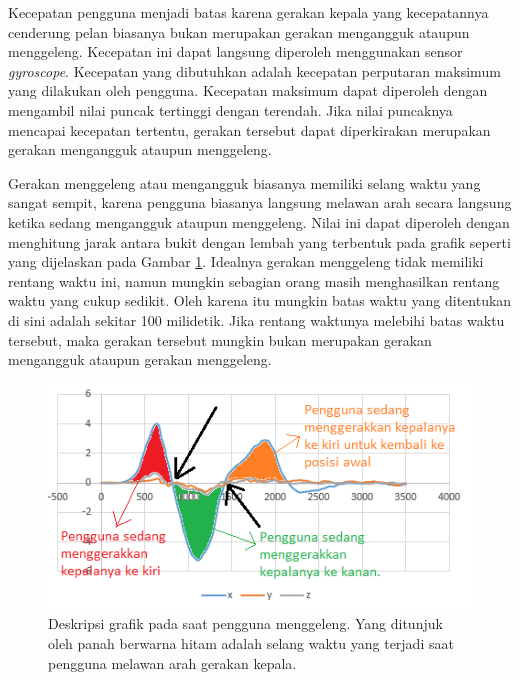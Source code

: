 Kecepatan pengguna menjadi batas karena gerakan kepala yang kecepatannya cenderung pelan biasanya bukan merupakan gerakan mengangguk ataupun menggeleng. Kecepatan ini dapat langsung diperoleh menggunakan sensor \textit{gyroscope}. Kecepatan yang dibutuhkan adalah kecepatan perputaran maksimum yang dilakukan oleh pengguna. Kecepatan maksimum dapat diperoleh dengan mengambil nilai puncak tertinggi dengan terendah. Jika nilai puncaknya mencapai kecepatan tertentu, gerakan tersebut dapat diperkirakan merupakan gerakan mengangguk ataupun menggeleng.

Gerakan menggeleng atau mengangguk biasanya memiliki selang waktu yang sangat sempit, karena pengguna biasanya langsung melawan arah secara langsung ketika sedang mengangguk ataupun menggeleng. Nilai ini dapat diperoleh dengan menghitung jarak antara bukit dengan lembah yang terbentuk pada grafik seperti yang dijelaskan pada Gambar \ref{fig:grafik-penjelasan-jarak-waktu-melawan-gerakan}. Idealnya gerakan menggeleng tidak memiliki rentang waktu ini, namun mungkin sebagian orang masih menghasilkan rentang waktu yang cukup sedikit. Oleh karena itu mungkin batas waktu yang ditentukan di sini adalah sekitar 100 milidetik. Jika rentang waktunya melebihi batas waktu tersebut, maka gerakan tersebut mungkin bukan merupakan gerakan mengangguk ataupun gerakan menggeleng. 

\begin{figure}[htbp]
\centering
\includegraphics[scale=0.7]{Gambar/grafik-penjelasan-jarak-waktu-melawan-gerakan.png}
\caption{Deskripsi grafik pada saat pengguna menggeleng. Yang ditunjuk oleh panah berwarna hitam adalah selang waktu yang terjadi saat pengguna melawan arah gerakan kepala.} 
\label{fig:grafik-penjelasan-jarak-waktu-melawan-gerakan}
\end{figure}


